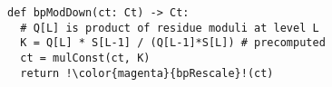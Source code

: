 \begin{figure}
\begin{lstlisting}[escapechar=!,label=lst:bpModDown,caption={
  Implementation of \texttt{bpModDown}.
}]
def bpModDown(ct: Ct) -> Ct:
  # Q[L] is product of residue moduli at level L
  K = Q[L] * S[L-1] / (Q[L-1]*S[L]) # precomputed
  ct = mulConst(ct, K)
  return !\color{magenta}{bpRescale}!(ct)
\end{lstlisting}
\vspace{-0.1in}
\end{figure}
